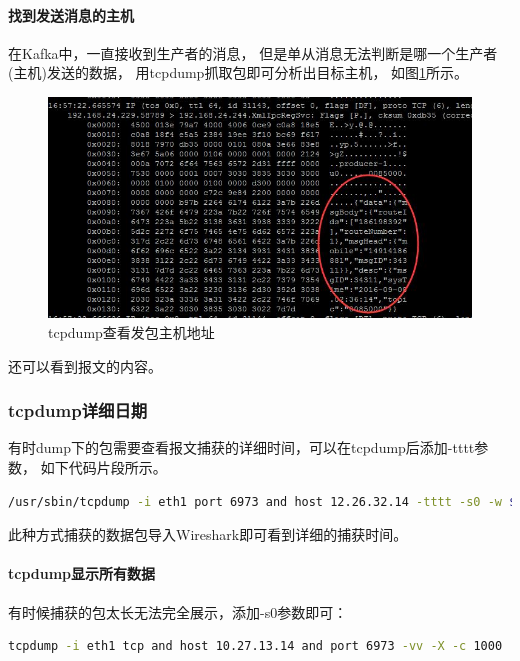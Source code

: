 \documentclass{book}
\begin{document}
\paragraph{找到发送消息的主机}

在Kafka中，一直接收到生产者的消息，
但是单从消息无法判断是哪一个生产者(主机)发送的数据，
用tcpdump抓取包即可分析出目标主机，
如图\ref{fig:tcpdumptracehost}所示。

\begin{figure}[htbp]
	\centering
	\includegraphics[scale=0.6]{tcpdumptracehost.jpg}
	\caption{tcpdump查看发包主机地址}
	\label{fig:tcpdumptracehost}
\end{figure}

还可以看到报文的内容。

\subsubsection{tcpdump详细日期}

有时dump下的包需要查看报文捕获的详细时间，可以在tcpdump后添加-tttt参数，
如下代码片段所示。

\begin{lstlisting}[language=Bash]
/usr/sbin/tcpdump -i eth1 port 6973 and host 12.26.32.14 -tttt -s0 -w $packageStoreDir/$currentTime.cap
\end{lstlisting}

此种方式捕获的数据包导入Wireshark即可看到详细的捕获时间。

\paragraph{tcpdump显示所有数据}

有时候捕获的包太长无法完全展示，添加-s0参数即可：

\begin{lstlisting}[language=Bash]
tcpdump -i eth1 tcp and host 10.27.13.14 and port 6973 -vv -X -c 1000
\end{lstlisting}
\end{document}
